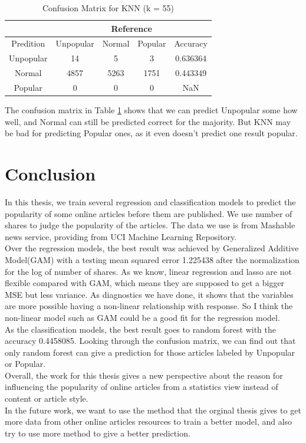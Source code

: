 \documentclass[11pt]{article}
\begin{document}
    \begin{table}[h]
        \centering
        \caption{Confusion Matrix for KNN (k = 55)}
        \begin{tabular}{ c | c | c | c | c }
            \hline\hline
            {} & \multicolumn{4}{c}{Reference} \\
            \hline
            Predition & Unpopular & Normal & Popular & Accuracy\\
            \hline
            Unpopular & 14 & 5 & 3 & 0.636364\\
            \hline
            Normal & 4857 & 5263 & 1751 & 0.443349\\
            \hline
            Popular & 0 & 0 & 0 & NaN\\
            \hline\hline
        \end{tabular}
        \label{table:knn}
    \end{table}

The confusion matrix in Table \ref{table:knn} shows that we can predict Unpopular some how well, and Normal can still be predicted correct for the majority. But KNN may be bad for predicting Popular ones, as it even doesn't predict one result popular.

\section{Conclusion}
In this thesis, we train several regression and classification models to predict the popularity of some online articles before them are published. We use number of shares to judge the popularity of the articles. The data we use is from Mashable news service, providing from UCI Machine Learning Repository.  \\
Over the regression models, the best result was achieved by Generalized Additive Model(GAM) with a testing mean squared error 1.225438 after the normalization for the log of number of shares. As we know, linear regression and lasso are not flexible compared with GAM, which means they are supposed to get a bigger MSE but less variance. As diagnostics we have done, it shows that the variables are more possible having a non-linear relationship with response. So I think the non-linear model such as GAM could be a good fit for the regression model. \\
As the classification models, the best result goes to random forest with the accuracy 0.4458085. Looking through the confusion matrix, we can find out that only random forest can give a prediction for those articles labeled by Unpopular or Popular.\\
Overall, the work for this thesis gives a new perspective about the reason for influencing the popularity of online articles from a statistics view instead of content or article style. \\
In the future work, we want to use the method that the orginal thesis gives to get more data from other online articles resources to train a better model, and also try to use more method to give a better prediction.
\end{document}
